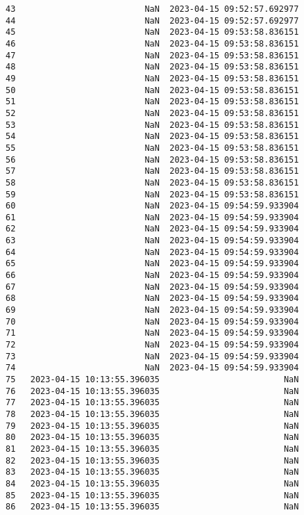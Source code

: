 \documentclass[11pt]{article}
\begin{document}
\begin{tcolorbox}[breakable, size=fbox, boxrule=.5pt, pad at break*=1mm, opacityfill=0]
\begin{Verbatim}[commandchars=\\\{\}]
43                          NaN  2023-04-15 09:52:57.692977
44                          NaN  2023-04-15 09:52:57.692977
45                          NaN  2023-04-15 09:53:58.836151
46                          NaN  2023-04-15 09:53:58.836151
47                          NaN  2023-04-15 09:53:58.836151
48                          NaN  2023-04-15 09:53:58.836151
49                          NaN  2023-04-15 09:53:58.836151
50                          NaN  2023-04-15 09:53:58.836151
51                          NaN  2023-04-15 09:53:58.836151
52                          NaN  2023-04-15 09:53:58.836151
53                          NaN  2023-04-15 09:53:58.836151
54                          NaN  2023-04-15 09:53:58.836151
55                          NaN  2023-04-15 09:53:58.836151
56                          NaN  2023-04-15 09:53:58.836151
57                          NaN  2023-04-15 09:53:58.836151
58                          NaN  2023-04-15 09:53:58.836151
59                          NaN  2023-04-15 09:53:58.836151
60                          NaN  2023-04-15 09:54:59.933904
61                          NaN  2023-04-15 09:54:59.933904
62                          NaN  2023-04-15 09:54:59.933904
63                          NaN  2023-04-15 09:54:59.933904
64                          NaN  2023-04-15 09:54:59.933904
65                          NaN  2023-04-15 09:54:59.933904
66                          NaN  2023-04-15 09:54:59.933904
67                          NaN  2023-04-15 09:54:59.933904
68                          NaN  2023-04-15 09:54:59.933904
69                          NaN  2023-04-15 09:54:59.933904
70                          NaN  2023-04-15 09:54:59.933904
71                          NaN  2023-04-15 09:54:59.933904
72                          NaN  2023-04-15 09:54:59.933904
73                          NaN  2023-04-15 09:54:59.933904
74                          NaN  2023-04-15 09:54:59.933904
75   2023-04-15 10:13:55.396035                         NaN
76   2023-04-15 10:13:55.396035                         NaN
77   2023-04-15 10:13:55.396035                         NaN
78   2023-04-15 10:13:55.396035                         NaN
79   2023-04-15 10:13:55.396035                         NaN
80   2023-04-15 10:13:55.396035                         NaN
81   2023-04-15 10:13:55.396035                         NaN
82   2023-04-15 10:13:55.396035                         NaN
83   2023-04-15 10:13:55.396035                         NaN
84   2023-04-15 10:13:55.396035                         NaN
85   2023-04-15 10:13:55.396035                         NaN
86   2023-04-15 10:13:55.396035                         NaN

\end{Verbatim}
\end{tcolorbox}
\end{document}

